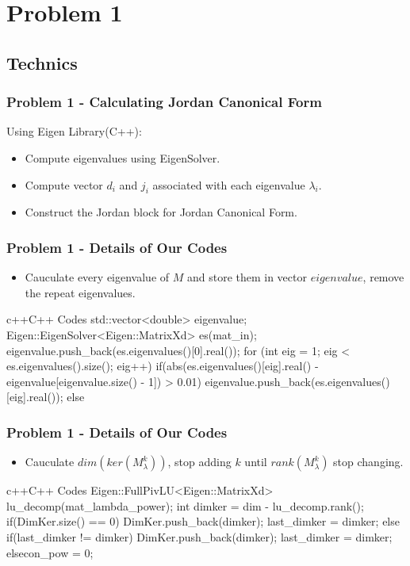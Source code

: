 \section{Problem 1}
\subsection{Technics}

    \begin{frame}
        \frametitle{Problem 1 - Calculating Jordan Canonical Form}
        Using Eigen Library(C++):
        \begin{itemize}
            \item Compute eigenvalues using EigenSolver.
            \item Compute vector \(d_i\) and \(j_i\) associated with each eigenvalue \(\lambda_i\).
            \item Construct the Jordan block for Jordan Canonical Form.
        \end{itemize}
    \end{frame}

    \begin{frame}[fragile]
        \frametitle{Problem 1 - Details of Our Codes}
        \begin{itemize}
            \item Cauculate every eigenvalue of \(M\) and store them in vector \(eigenvalue\), remove the repeat eigenvalues.
        \end{itemize}
        \begin{codeblock}{c++}{C++ Codes}
    std::vector<double> eigenvalue;
    Eigen::EigenSolver<Eigen::MatrixXd> es(mat_in);
    eigenvalue.push_back(es.eigenvalues()[0].real());
    for (int eig = 1; eig < es.eigenvalues().size(); eig++){
        if(abs(es.eigenvalues()[eig].real() - eigenvalue[eigenvalue.size() - 1]) > 0.01){
            eigenvalue.push_back(es.eigenvalues()[eig].real()); }
        else{}
    }
        \end{codeblock}
    \end{frame}

    \begin{frame}[fragile]
        \frametitle{Problem 1 - Details of Our Codes}
        \begin{itemize}
            \item Cauculate \(dim(ker(M_\lambda^k))\), stop adding \(k\) until \(rank(M_\lambda^k)\) stop changing.
        \end{itemize}
        \begin{codeblock}{c++}{C++ Codes}
    Eigen::FullPivLU<Eigen::MatrixXd> lu_decomp(mat_lambda_power);
    int dimker = dim - lu_decomp.rank();
    if(DimKer.size() == 0){
        DimKer.push_back(dimker);
        last_dimker = dimker;}
    else{
        if(last_dimker != dimker){
            DimKer.push_back(dimker);
            last_dimker = dimker;}
        else{con_pow = 0;}}    
        \end{codeblock}
    \end{frame}

